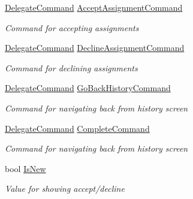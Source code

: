 \begin{DoxyCompactItemize}
\hyperlink{class_delegate_command}{Delegate\+Command} \hyperlink{class_field_service_1_1_win_r_t_1_1_view_models_1_1_assignment_view_model_a01fc3a9aba279c5f2a1b6292f7319ad9}{Accept\+Assignment\+Command}
\begin{DoxyCompactList}\small\item\em Command for accepting assignments \end{DoxyCompactList}\item 
\hyperlink{class_delegate_command}{Delegate\+Command} \hyperlink{class_field_service_1_1_win_r_t_1_1_view_models_1_1_assignment_view_model_ab28ad7b948fd6a8116b83f04195b93ff}{Decline\+Assignment\+Command}
\begin{DoxyCompactList}\small\item\em Command for declining assignments \end{DoxyCompactList}\item 
\hyperlink{class_delegate_command}{Delegate\+Command} \hyperlink{class_field_service_1_1_win_r_t_1_1_view_models_1_1_assignment_view_model_acb7a2acd27408e8ac67c32e3afd42b28}{Go\+Back\+History\+Command}
\begin{DoxyCompactList}\small\item\em Command for navigating back from history screen \end{DoxyCompactList}\item 
\hyperlink{class_delegate_command}{Delegate\+Command} \hyperlink{class_field_service_1_1_win_r_t_1_1_view_models_1_1_assignment_view_model_aeefbe8b2acd84ddcd27df441569b5538}{Complete\+Command}
\begin{DoxyCompactList}\small\item\em Command for navigating back from history screen \end{DoxyCompactList}\item 
bool \hyperlink{class_field_service_1_1_win_r_t_1_1_view_models_1_1_assignment_view_model_a12f3036484600438b70b44dcc0ca1e31}{Is\+New}
\begin{DoxyCompactList}\small\item\em Value for showing accept/decline \end{DoxyCompactList}\item 

\end{DoxyCompactItemize}
